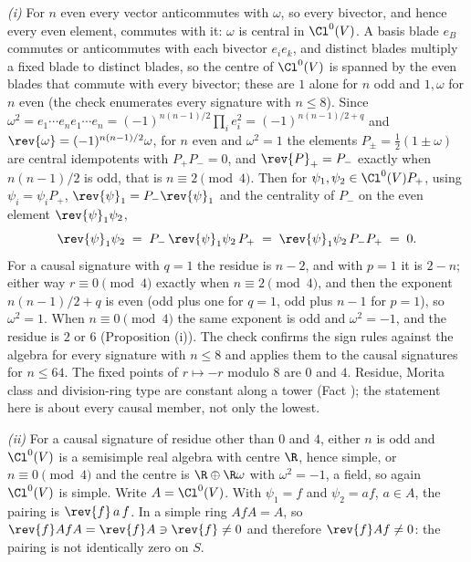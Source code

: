 \emph{(i)} For $n$ even every vector anticommutes with $\omega$, so every bivector, and hence every even element, commutes with it: $\omega$ is central in $\Cl^{0}(V)$. A basis blade $e_{B}$ commutes or anticommutes with each bivector $e_{i}e_{k}$, and distinct blades multiply a fixed blade to distinct blades, so the centre of $\Cl^{0}(V)$ is spanned by the even blades that commute with every bivector; these are $1$ alone for $n$ odd and $1, \omega$ for $n$ even (the check enumerates every signature with $n \le 8$). Since $\omega^{2} = e_{1}\cdots e_{n}e_{1}\cdots e_{n} = (-1)^{n(n-1)/2}\prod_{i}e_{i}^{2} = (-1)^{n(n-1)/2 + q}$ and $\rev{\omega} = (-1)^{n(n-1)/2}\omega$, for $n$ even and $\omega^{2} = 1$ the elements $P_{\pm} = \tfrac12(1 \pm \omega)$ are central idempotents with $P_{+}P_{-} = 0$, and $\rev{P}_{+} = P_{-}$ exactly when $n(n-1)/2$ is odd, that is $n \equiv 2 \pmod 4$. Then for $\psi_{1}, \psi_{2} \in \Cl^{0}(V)P_{+}$, using $\psi_{i} = \psi_{i}P_{+}$, $\rev{\psi}_{1} = P_{-}\rev{\psi}_{1}$ and the centrality of $P_{-}$ on the even element $\rev{\psi}_{1}\psi_{2}$,
\[
\rev{\psi}_{1}\psi_{2} \;=\; P_{-}\,\rev{\psi}_{1}\psi_{2}\,P_{+} \;=\; \rev{\psi}_{1}\psi_{2}\,P_{-}P_{+} \;=\; 0 .
\]
For a causal signature with $q = 1$ the residue is $n - 2$, and with $p = 1$ it is $2 - n$; either way $r \equiv 0 \pmod 4$ exactly when $n \equiv 2 \pmod 4$, and then the exponent $n(n-1)/2 + q$ is even (odd plus one for $q = 1$, odd plus $n - 1$ for $p = 1$), so $\omega^{2} = 1$. When $n \equiv 0 \pmod 4$ the same exponent is odd and $\omega^{2} = -1$, and the residue is $2$ or $6$ (Proposition (i)). The check confirms the sign rules against the algebra for every signature with $n \le 8$ and applies them to the causal signatures for $n \le 64$. The fixed points of $r \mapsto -r$ modulo $8$ are $0$ and $4$. Residue, Morita class and division-ring type are constant along a tower (Fact ); the statement here is about every causal member, not only the lowest.

\emph{(ii)} For a causal signature of residue other than $0$ and $4$, either $n$ is odd and $\Cl^{0}(V)$ is a semisimple real algebra with centre $\R$, hence simple, or $n \equiv 0 \pmod 4$ and the centre is $\R \oplus \R\omega$ with $\omega^{2} = -1$, a field, so again $\Cl^{0}(V)$ is simple. Write $A = \Cl^{0}(V)$. With $\psi_{1} = f$ and $\psi_{2} = af$, $a \in A$, the pairing is $\rev{f}\,a\,f$. In a simple ring $AfA = A$, so $\rev{f}AfA = \rev{f}A \ni \rev{f} \ne 0$ and therefore $\rev{f}Af \ne 0$: the pairing is not identically zero on $S$.

